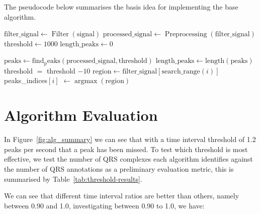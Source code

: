 The pseudocode below summarises the basis idea for implementing the base algorithm.

\begin{center}
\begin{algorithm}
\caption{Basic Algorithm form}
\begin{algorithmic}

    \State $\text{filter\_signal} \gets \operatorname{Filter}(\text{signal})$
    \State $\text{processed\_signal} \gets \operatorname{Preprocessing}(\text{filter\_signal})$
    \State $\text{threshold} \gets 1000$
    \State $\text{length\_peaks} \gets 0$

        \State $\text{peaks} \gets \operatorname{find_peaks}(\text{processed\_signal}, \text{threshold})$
        \State $\text{length\_peaks} \gets \text{length}(\text{peaks})$
        \State threshold $=$ threshold $- 10$
    \EndWhile
    \State $\text{region} \gets \text{filter\_signal}[\text{search\_range}(i)]$
    \State peaks\_indices$[i]$ $\gets \operatorname{argmax}(\text{region})$
    \EndFor

\end{algorithmic}
\end{algorithm}
\end{center}


\section{Algorithm Evaluation}
In Figure~\ref{fig:alg_summary} we can see that with a time interval threshold of 1.2 peaks per second that a peak has been missed. To test 
which threshold is most effective, we test the number of QRS complexes each algorithm identifies against the number of QRS annotations as a preliminary 
evaluation metric, this 
is summarised by Table~\ref{tab:threshold-results}.

\begin{table}[H]
    \centering
    \caption{Proportion of peaks detected for different threshold values between 0.8 and 1.4 in the first hour of data.}
    \label{tab:threshold-results}


\end{table}

We can see that different time interval ratios are better than others, namely between 0.90 and 1.0, investigating between 0.90 to 1.0, we have:
\begin{table}[H]
    \centering
    \caption{Proportion of peaks detected for different threshold values between 0.9 and 1.0 in the first hour of data.}
    \label{tab:threshold-results_0.90}


\end{table}

